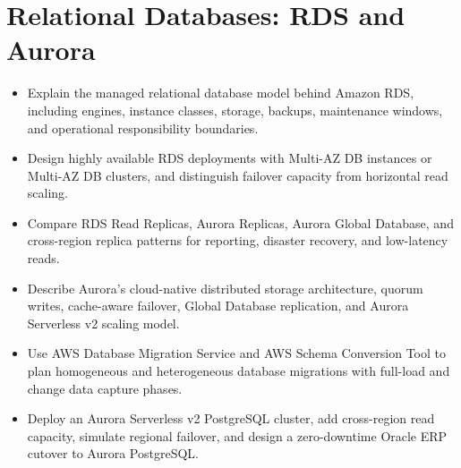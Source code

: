 \chapter{Relational Databases: RDS and Aurora}
%
%
\begin{objectives}
\begin{itemize}
    \item Explain the managed relational database model behind Amazon RDS, including engines, instance classes, storage, backups, maintenance windows, and operational responsibility boundaries.
    \item Design highly available RDS deployments with Multi-AZ DB instances or Multi-AZ DB clusters, and distinguish failover capacity from horizontal read scaling.
    \item Compare RDS Read Replicas, Aurora Replicas, Aurora Global Database, and cross-region replica patterns for reporting, disaster recovery, and low-latency reads.
    \item Describe Aurora's cloud-native distributed storage architecture, quorum writes, cache-aware failover, Global Database replication, and Aurora Serverless v2 scaling model.
    \item Use AWS Database Migration Service and AWS Schema Conversion Tool to plan homogeneous and heterogeneous database migrations with full-load and change data capture phases.
    \item Deploy an Aurora Serverless v2 PostgreSQL cluster, add cross-region read capacity, simulate regional failover, and design a zero-downtime Oracle ERP cutover to Aurora PostgreSQL.
\end{itemize}
\end{objectives}

